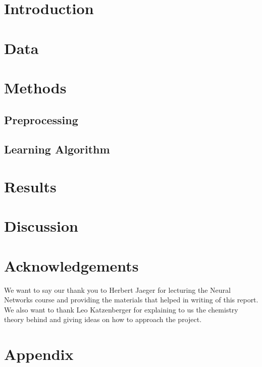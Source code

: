 \documentclass{article}
\begin{document}
\clearpage
\begin{multicols}{2}
\section{Introduction}


\section{Data}


\section{Methods}

\subsection{Preprocessing}


\subsection{Learning Algorithm}


\section {Results}


\section{Discussion}


\section*{Acknowledgements}
We want to say our thank you to Herbert Jaeger for lecturing the Neural Networks course and providing the materials that helped in writing of this report. We also want to thank Leo Katzenberger for explaining to us the chemistry theory behind and giving ideas on how to approach the project.

\end{multicols}


\section*{Appendix}


\newpage


\end{document}
